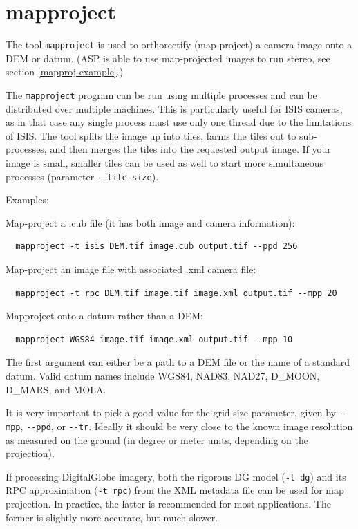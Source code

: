 \clearpage

\section{mapproject}
\label{mapproject}

The tool \texttt{mapproject} is used to orthorectify (map-project) a camera image onto
a DEM or datum. (ASP is able to use map-projected images to run stereo, see section
\ref{mapproj-example}.)

The \texttt{mapproject} program can be run using multiple processes and can be
distributed over multiple machines. This is particularly useful for
ISIS cameras, as in that case any single process must use only one thread
due to the limitations of ISIS.  The tool splits the image up into tiles,
farms the tiles out to sub-processes, and then merges the tiles into the
requested output image. If your image is small, smaller tiles can be used
as well to start more simultaneous processes (parameter \texttt{-\/-tile-size}).

Examples:

Map-project a .cub file (it has both image and camera information):
\begin{verbatim}
  mapproject -t isis DEM.tif image.cub output.tif --ppd 256
\end{verbatim}

Map-project an image file with associated .xml camera file:
\begin{verbatim}
  mapproject -t rpc DEM.tif image.tif image.xml output.tif --mpp 20
\end{verbatim}

Mapproject onto a datum rather than a DEM:
\begin{verbatim}
  mapproject WGS84 image.tif image.xml output.tif --mpp 10
\end{verbatim}

The first argument can either be a path to a DEM file or the name of a standard datum.
Valid datum names include WGS84, NAD83, NAD27, D\_MOON, D\_MARS, and MOLA.

It is very important to pick a good value for the grid size parameter, given by
\texttt{-\/-mpp}, \texttt{-\/-ppd}, or \texttt{-\/-tr}. Ideally it should be very close to the known image resolution
as measured on the ground (in degree or meter units, depending on the projection).

If processing DigitalGlobe imagery, both the rigorous DG model (\texttt{-t dg}) and its
RPC approximation (\texttt{-t rpc}) from the XML metadata file can be used for
map projection. In practice, the latter is recommended for most
applications. The former is slightly more accurate, but much slower.  

